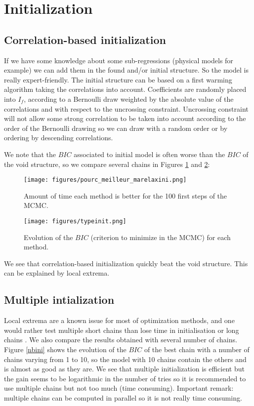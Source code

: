 \documentclass[12pt,a4paper]{report}
\begin{document}
		
		
	\section{Initialization}
		\subsection{Correlation-based initialization}
		 If we have some knowledge about some sub-regressions (physical models for example) we can add them in the found and/or initial structure. So the model is really expert-friendly.
The initial structure can be based on a first warming algorithm taking the correlations into account. Coefficients are randomly placed into $I_f$, according to a Bernoulli draw weighted by the absolute value of the correlations and with respect to the uncrossing constraint. Uncrossing constraint will not allow some strong correlation to be taken into account according to the order of the Bernoulli drawing so we can draw with a random order or by ordering by descending correlations. 
		
		We note that the $BIC$ associated to initial model is often worse than the $BIC$ of the void structure, so we compare several chains in Figures \ref{pourcini} and \ref{Bicini}:			
			
	\begin{center}
		\begin{figure}[h!]
		\centering
		\texttt{[image: figures/pourc\_meilleur\_marelaxini.png]} 
		\caption{Amount of time each method is better for the 100 first steps of the MCMC. } \label{pourcini}
		\end{figure}		
	\end{center}
	
	\begin{center}
		\begin{figure}[h!]
		\centering
		\texttt{[image: figures/typeinit.png]} %
		\caption{Evolution of the $BIC$ (criterion to minimize in the MCMC) for each method.}\label{Bicini}
		\end{figure}
	\end{center}
	We see that correlation-based initialization quickly beat the void structure. This can be explained by local extrema.
	\FloatBarrier
		\subsection{Multiple intialization}	
		Local extrema are a known issue for most of optimization methods, and one would rather test multiple short chains than lose time in initialisation or long chains \cite{gilks1996markov}. 
		We also compare the results obtained with several number of chains. Figure \ref{nbini} shows the evolution of the $BIC$ of the best chain with a number of chains varying from 1 to 10, so the model with 10 chains contain the others and is almost as good as they are. We see that multiple initialization is efficient but the gain seems to be logarithmic in the number of tries so it is recommended to use multiple chains but not too much (time consuming). Important remark: multiple chains can be computed in parallel so it is not really time consuming.		
			
\end{document}
